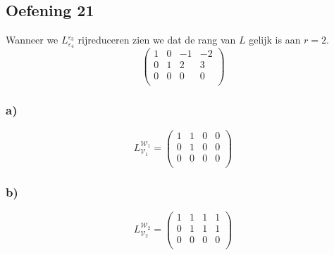 \documentclass[lineaire_algebra_oplossingen.tex]{subfiles}
\begin{document}
\subsection{Oefening 21}
Wanneer we $L_{\varepsilon_4}^{\varepsilon_3}$ rijreduceren zien we dat de rang van $L$ gelijk is aan $r=2$.
\[
\begin{pmatrix}
1 & 0 & -1 & -2\\
0 & 1 & 2 & 3\\
0 & 0 & 0 & 0\\
\end{pmatrix}
\]
\subsubsection*{a)}
\[
L_{\mathcal{V}_1}^{\mathcal{W}_1} = 
\begin{pmatrix}
1 & 1 & 0 & 0\\
0 & 1 & 0 & 0\\
0 & 0 & 0 & 0\\
\end{pmatrix}
\]

\subsubsection*{b)}
\[
L_{\mathcal{V}_2}^{\mathcal{W}_2} = 
\begin{pmatrix}
1 & 1 & 1 & 1\\
0 & 1 & 1 & 1\\
0 & 0 & 0 & 0\\
\end{pmatrix}
\]
\end{document}
